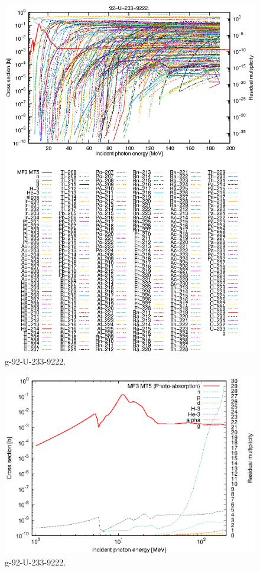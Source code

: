 \begin{figure}
 \includegraphics[width=\linewidth]{eps/g_92-U-233_9222.eps}
  \caption{g-92-U-233-9222.}
\end{figure}
\newpage \clearpage

\begin{figure}
 \includegraphics[width=\linewidth]{eps-log/g_92-U-233_9222.eps}
 \caption{g-92-U-233-9222.}
\end{figure}
\newpage \clearpage

